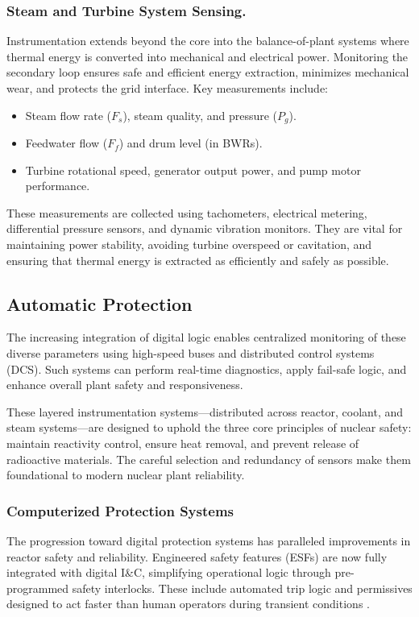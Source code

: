 \documentclass[12pt]{article}
\begin{document}
\subsubsection*{Steam and Turbine System Sensing.}
Instrumentation extends beyond the core into the balance-of-plant systems where thermal energy is converted into mechanical and electrical power. Monitoring the secondary loop ensures safe and efficient energy extraction, minimizes mechanical wear, and protects the grid interface. Key measurements include:
\begin{itemize}
  \item Steam flow rate ($F_s$), steam quality, and pressure ($P_g$).
  \item Feedwater flow ($F_f$) and drum level (in BWRs).
  \item Turbine rotational speed, generator output power, and pump motor performance.
\end{itemize}
These measurements are collected using tachometers, electrical metering, differential pressure sensors, and dynamic vibration monitors. They are vital for maintaining power stability, avoiding turbine overspeed or cavitation, and ensuring that thermal energy is extracted as efficiently and safely as possible.

\subsection{Automatic Protection}
The increasing integration of digital logic enables centralized monitoring of these diverse parameters using high-speed buses and distributed control systems (DCS). Such systems can perform real-time diagnostics, apply fail-safe logic, and enhance overall plant safety and responsiveness.

These layered instrumentation systems—distributed across reactor, coolant, and steam systems—are designed to uphold the three core principles of nuclear safety: maintain reactivity control, ensure heat removal, and prevent release of radioactive materials. The careful selection and redundancy of sensors make them foundational to modern nuclear plant reliability.

\subsubsection*{Computerized Protection Systems}
\label{sec:protection}

The progression toward digital protection systems has paralleled improvements in reactor safety and reliability. Engineered safety features (ESFs) are now fully integrated with digital I\&C, simplifying operational logic through pre-programmed safety interlocks. These include automated trip logic and permissives designed to act faster than human operators during transient conditions \cite{moderninstruments}.
\end{document}
